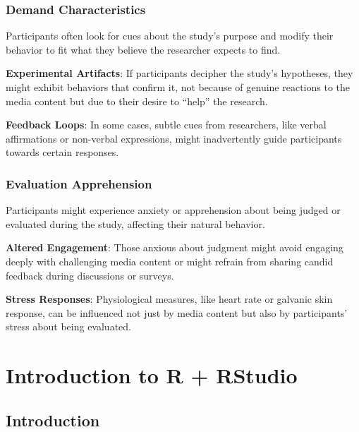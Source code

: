\documentclass[
  b5paper]{book}
\begin{document}
\hypertarget{demand-characteristics}{%
\subsection*{Demand Characteristics}\label{demand-characteristics}}

Participants often look for cues about the study's purpose and modify their behavior to fit what they believe the researcher expects to find.

\textbf{Experimental Artifacts}: If participants decipher the study's hypotheses, they might exhibit behaviors that confirm it, not because of genuine reactions to the media content but due to their desire to ``help'' the research.

\textbf{Feedback Loops}: In some cases, subtle cues from researchers, like verbal affirmations or non-verbal expressions, might inadvertently guide participants towards certain responses.

\hypertarget{evaluation-apprehension}{%
\subsection*{Evaluation Apprehension}\label{evaluation-apprehension}}

Participants might experience anxiety or apprehension about being judged or evaluated during the study, affecting their natural behavior.

\textbf{Altered Engagement}: Those anxious about judgment might avoid engaging deeply with challenging media content or might refrain from sharing candid feedback during discussions or surveys.

\textbf{Stress Responses}: Physiological measures, like heart rate or galvanic skin response, can be influenced not just by media content but also by participants' stress about being evaluated.

\hypertarget{introduction-to-r-rstudio}{%
\chapter{Introduction to R + RStudio}\label{introduction-to-r-rstudio}}

\hypertarget{introduction-5}{%
\section{Introduction}\label{introduction-5}}
\end{document}
